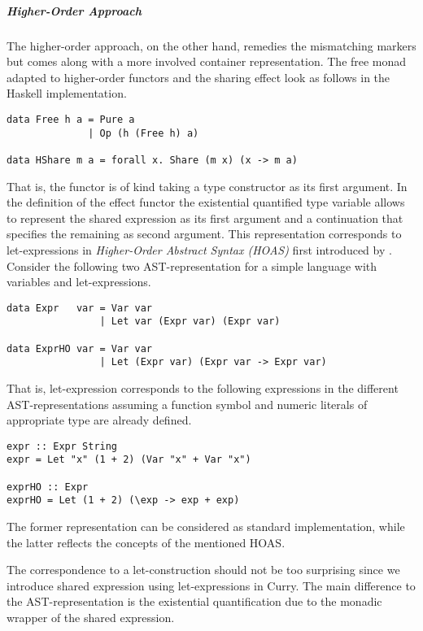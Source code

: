 \subparagraph{Higher-Order Approach}
The higher-order approach, on the other hand, remedies the mismatching markers but comes along with a more involved container representation.
The free monad adapted to higher-order functors and the sharing effect look as follows in the Haskell implementation.

\begin{verbatim}
data Free h a = Pure a
              | Op (h (Free h) a)  

data HShare m a = forall x. Share (m x) (x -> m a)
\end{verbatim}

That is, the functor  is of kind \hinl{(* -> *) -> * -> *} taking a type constructor as its first argument.
In the definition of the effect functor  the existential quantified type variable   allows to represent the shared expression as its first argument  and a continuation  that specifies the remaining as second argument.
This representation corresponds to let-expressions in \emph{Higher-Order Abstract Syntax (HOAS)} first introduced by \citet{pfenning1988higher}.
Consider the following two AST-representation for a simple language with variables and let-expressions.

\begin{verbatim}
data Expr   var = Var var
                | Let var (Expr var) (Expr var)

data ExprHO var = Var var
                | Let (Expr var) (Expr var -> Expr var)
\end{verbatim}

That is, let-expression  corresponds to the following expressions in the different AST-representations assuming a function symbol \hinl{+} and numeric literals of appropriate type are already defined.

\begin{verbatim}
expr :: Expr String
expr = Let "x" (1 + 2) (Var "x" + Var "x")

exprHO :: Expr
exprHO = Let (1 + 2) (\exp -> exp + exp)
\end{verbatim}

The former representation can be considered as standard implementation, while the latter reflects the concepts of the mentioned HOAS.

The correspondence to a let-construction should not be too surprising since we introduce shared expression using let-expressions in Curry.
The main difference to the AST-representation is the existential quantification due to the monadic wrapper of the shared expression.


